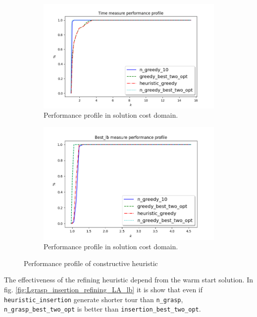 \begin{figure}
	\centering
	\begin{subfigure}{.7\textwidth}
		\centering
		\includegraphics[width=\columnwidth]{../res/Lgreedy_refining_LA_time.png}
		\caption{Performance profile in solution cost domain.}
		\label{fig:Lgreedy_refining_LA_time}
	\end{subfigure}
	\begin{subfigure}{.7\textwidth}
		\centering
		\includegraphics[width=\columnwidth]{../res/Lgreedy_refining_LA_lb.png}
		\caption{Performance profile in solution cost domain.}
		\label{fig:Lgreedy_refining_LA_lb}
	\end{subfigure}
	\caption{Performance profile of constructive heuristic}
	\label{fig:pp_Lgreedy_refining}
\end{figure}


The effectiveness of the refining heuristic depend from the warm start solution. In fig. \ref{fig:Lgrasp_insertion_refining_LA_lb} it is show that even if \texttt{heuristic\_insertion} generate shorter tour than \texttt{n\_grasp}, \texttt{n\_grasp\_best\_two\_opt} is better than \texttt{insertion\_best\_two\_opt}.

